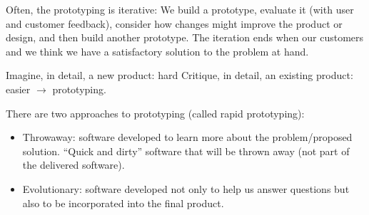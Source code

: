 Often, the prototyping is iterative: We build a prototype, evaluate it (with
user and customer feedback), consider how changes might improve the product or
design, and then build another prototype. The iteration ends when our customers
and we think we have a satisfactory solution to the problem at hand. \newline

Imagine, in detail, a new product: hard \newline
Critique, in detail, an existing product: easier $\rightarrow$ prototyping. \newline

There are two approaches to prototyping (called rapid prototyping):

\begin{itemize}
    \item Throwaway: software developed to learn more about the
    problem/proposed solution. “Quick and dirty” software that will be thrown
    away (not part of the delivered software).
    \item Evolutionary: software developed not only to help us answer questions
    but also to be incorporated into the final product.
\end{itemize}
